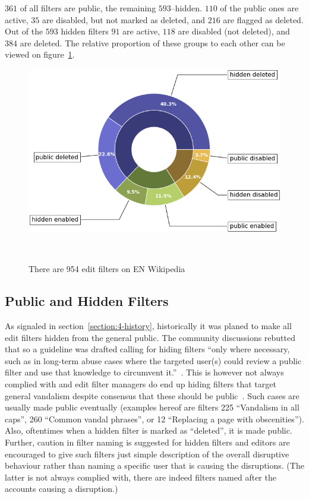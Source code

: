 $361$ of all filters are public, the remaining $593$–hidden.
$110$ of the public ones are active, $35$ are disabled, but not marked as deleted, and $216$ are flagged as deleted.
Out of the $593$ hidden filters $91$ are active, $118$ are disabled (not deleted), and $384$ are deleted.
The relative proportion of these groups to each other can be viewed on figure~\ref{fig:general-stats}.

\begin{figure}
\centering
  \includegraphics[width=0.9\columnwidth]{pics/general-stats-donut.png}
  \caption{There are 954 edit filters on EN Wikipedia}~\label{fig:general-stats}
\end{figure}

\subsection{Public and Hidden Filters}

As signaled in section~\ref{section:4-history}, historically it was planed to make all edit filters hidden from the general public.
The community discussions rebutted that so a guideline was drafted calling for hiding filters
``only where necessary, such as in long-term abuse cases where the targeted user(s) could review a public filter and use that knowledge to circumvent it.''~\cite{Wikipedia:EditFilter}.
This is however not always complied with and edit filter managers do end up hiding filters that target general vandalism despite consensus that these should be public~\cite{Wikipedia:PrivacyGeneralVandalism}.
Such cases are usually made public eventually (examples hereof are filters 225 ``Vandalism in all caps'', 260 ``Common vandal phrases'', or 12 ``Replacing a page with obscenities'').
Also, oftentimes when a hidden filter is marked as ``deleted'', it is made public. %
Further, caution in filter naming is suggested for hidden filters and editors are encouraged to give such filters just simple description of the overall disruptive behaviour rather than naming a specific user that is causing the disruptions.
(The latter is not always complied with, there are indeed filters named after the accounts causing a disruption.)

